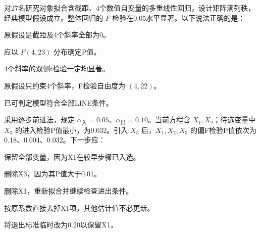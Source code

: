 \par\addvspace{6pt}\noindent\begin{minipage}{\linewidth}


对27名研究对象拟合含截距、4个数值自变量的多重线性回归，设计矩阵满列秩，经典模型假设成立。整体回归的 \(F\) 检验在0.05水平显著。以下说法正确的是：


\begin{choices}

\item 原假设是截距及4个斜率全部为0。

\item 应以 \(F(4,23)\) 分布确定P值。

\item 4个斜率的双侧t检验一定均显著。

\item 原假设只约束4个斜率，F检验自由度为 \((4,22)\)。

\item 已可判定模型符合全部LINE条件。

\end{choices}

\end{minipage}\par\vspace{4pt}

\par\addvspace{6pt}\noindent\begin{minipage}{\linewidth}


采用逐步前进法，规定 \(\alpha_{\text{入}}=0.05\)、\(\alpha_{\text{出}}=0.10\)。当前方程含 \(X_1,X_2\)；待选变量中 \(X_3\) 的进入检验P值最小，为0.032。引入 \(X_3\) 后，\(X_1,X_2,X_3\) 的偏F检验P值依次为0.18、0.004、0.032。下一步应：


\begin{choices}

\item 保留全部变量，因为X1在较早步骤已入选。

\item 删除X3，因为其P值大于0.01。

\item 删除X1，重新拟合并继续检查进出条件。

\item 按原系数直接去掉X1项，其他估计值不必更新。

\item 将退出标准临时改为0.20以保留X1。

\end{choices}

\end{minipage}\par\vspace{4pt}

